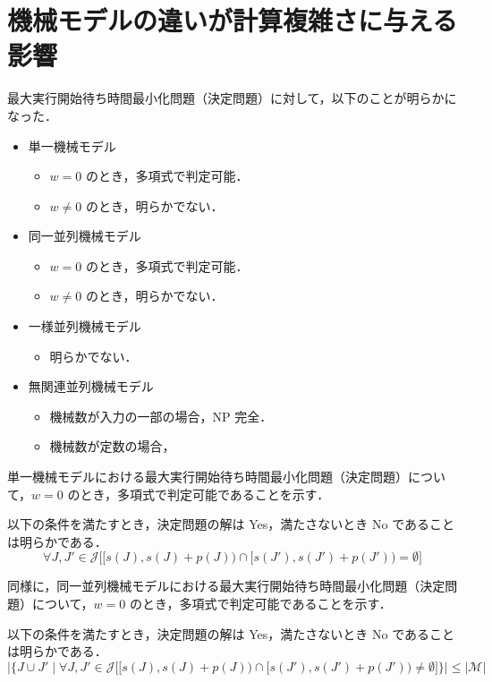 \documentclass[12pt]{optlab-bachelor}
\begin{document}
  \section{機械モデルの違いが計算複雑さに与える影響}
  最大実行開始待ち時間最小化問題（決定問題）に対して，以下のことが明らかになった．
  \begin{itemize}
    \item 単一機械モデル
    \begin{itemize}
      \item $w = 0$ のとき，多項式で判定可能．
      \item $w \neq 0$ のとき，明らかでない．
    \end{itemize}
    \item 同一並列機械モデル
    \begin{itemize}
      \item $w = 0$ のとき，多項式で判定可能．
      \item $w \neq 0$ のとき，明らかでない．
    \end{itemize}
    \item 一様並列機械モデル
    \begin{itemize}
      \item 明らかでない．
    \end{itemize}
    \item 無関連並列機械モデル
    \begin{itemize}
      \item 機械数が入力の一部の場合，NP 完全．
      \item 機械数が定数の場合，
    \end{itemize}
  \end{itemize}

  単一機械モデルにおける最大実行開始待ち時間最小化問題（決定問題）について，$w = 0$ のとき，多項式で判定可能であることを示す．

  以下の条件を満たすとき，決定問題の解は Yes，満たさないとき No であることは明らかである．
  $$\forall J,J' \in \mathcal{J}\big[[s(J),s(J) + p(J)) \cap [s(J'),s(J') + p(J')) = \emptyset\big]$$

  同様に，同一並列機械モデルにおける最大実行開始待ち時間最小化問題（決定問題）について，$w = 0$ のとき，多項式で判定可能であることを示す．

  以下の条件を満たすとき，決定問題の解は Yes，満たさないとき No であることは明らかである．
  $$\bigg|\bigg\{ J \cup J' \mid \forall J,J' \in \mathcal{J}\big[[s(J),s(J) + p(J)) \cap [s(J'),s(J') + p(J')) \neq \emptyset\big]\bigg\}\bigg| \le |\mathcal{M}|$$
\end{document}
